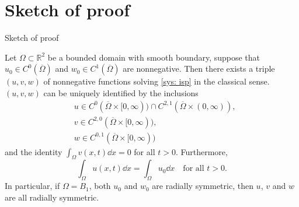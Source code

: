 \section{Sketch of proof}
\begin{frame}{Sketch of proof}

\begin{lemma}
\label{le: global existence and uniqueness}
	Let $\Omega\subset\mathbb{R}^2$ be a bounded domain with smooth boundary, suppose that $u_0\in C^0(\overline{\Omega})$ and $w_0\in C^1(\overline{\Omega})$ are nonnegative.
    Then there exists a triple $(u, v, w)$ of nonnegative functions solving \eqref{sys: isp} in the classical sense. $(u, v, w)$ can be uniquely identified by the inclusions		
	\begin{align*}
	& u \in C^0(\overline{\Omega} \times[0, \infty)) \cap C^{2,1}(\overline{\Omega} \times(0, \infty)), \\
	& v \in C^{2,0}(\overline{\Omega} \times[0, \infty)), \\
	& w \in C^{0,1}(\overline{\Omega} \times[0, \infty))
	\end{align*}
and the identity
\(\int_{\Omega} v(x, t)\dd x=0\) for all  \(t > 0\).
Furthermore,
\begin{equation*}
	\int_{\Omega} u(x, t) \dd {x}=\int_{\Omega} u_{0} \dd x
    \quad\text{for all } t > 0.
\end{equation*}
In particular, if $\Omega = B_1$, both $u_0$ and $w_0$ are radially symmetric, then $u$, $v$ and $w$ are all radially symmetric.
\end{lemma}
\end{frame}


